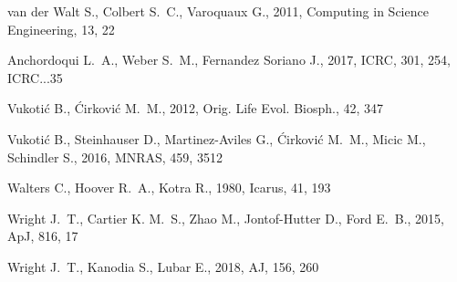 \documentclass[crop]{CSLB}
\begin{document}
\begin{thebibliography}{95}
{van der Walt} S., {Colbert} S.~C., {Varoquaux} G., 2011, Computing in Science
  Engineering, 13, 22

 Anchordoqui L.~A., Weber S.~M., Fernandez Soriano J., 2017, ICRC, 301, 254, ICRC...35

Vukoti{\'{c}} B., {\'{C}}irkovi{\'{c}} M.~M., 2012, Orig. Life Evol. Biosph.,
  42, 347

Vukoti{\'{c}} B., Steinhauser D., Martinez-Aviles G., {\'{C}}irkovi{\'{c}}
  M.~M., Micic M., Schindler S., 2016, MNRAS, 459, 3512

Walters C., Hoover R.~A., Kotra R., 1980, Icarus, 41, 193

Wright J.~T., Cartier K. M.~S., Zhao M., Jontof-Hutter D., Ford E.~B., 2015,
  ApJ, 816, 17

Wright J.~T., Kanodia S., Lubar E., 2018, AJ, 156, 260

\end{thebibliography}
\end{document}
